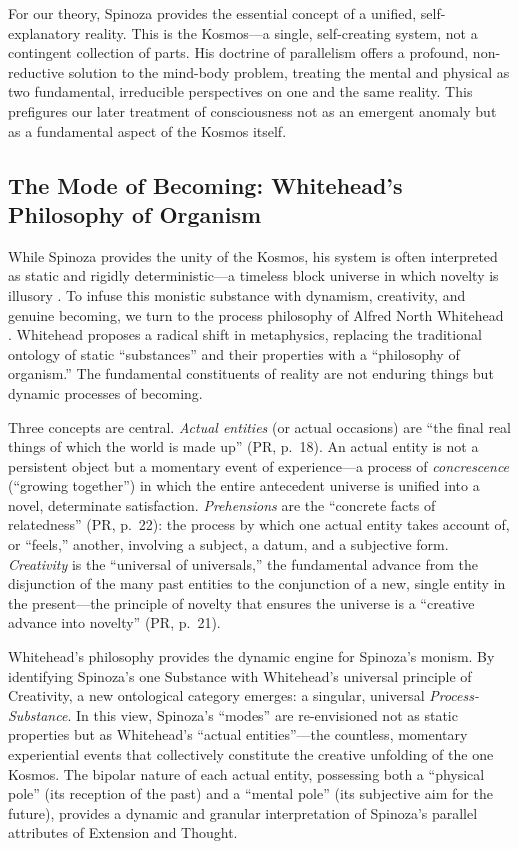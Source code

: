 \documentclass[12pt,a4paper]{article}
\begin{document}
For our theory, Spinoza provides the essential concept of a unified,
self-explanatory reality.  This is the Kosmos---a single, self-creating
system, not a contingent collection of parts.  His doctrine of parallelism
offers a profound, non-reductive solution to the mind-body problem,
treating the mental and physical as two fundamental, irreducible
perspectives on one and the same reality.  This prefigures our later
treatment of consciousness not as an emergent anomaly but as a fundamental
aspect of the Kosmos itself.

\subsection{The Mode of Becoming: Whitehead's Philosophy of Organism}
\label{sec:whitehead}

While Spinoza provides the unity of the Kosmos, his system is often
interpreted as static and rigidly deterministic---a timeless block
universe in which novelty is illusory \citep{dipoppa2010}.  To infuse this
monistic substance with dynamism, creativity, and genuine becoming, we turn
to the process philosophy of Alfred North Whitehead \citep{whitehead1929}.
Whitehead proposes a radical shift in metaphysics, replacing the
traditional ontology of static ``substances'' and their properties with a
``philosophy of organism.''  The fundamental constituents of reality are
not enduring things but dynamic processes of becoming.

Three concepts are central.  \emph{Actual entities} (or actual occasions)
are ``the final real things of which the world is made up'' (PR, p.\ 18).
An actual entity is not a persistent object but a momentary event of
experience---a process of \emph{concrescence} (``growing together'') in
which the entire antecedent universe is unified into a novel, determinate
satisfaction.  \emph{Prehensions} are the ``concrete facts of relatedness''
(PR, p.\ 22): the process by which one actual entity takes account of, or
``feels,'' another, involving a subject, a datum, and a subjective form.
\emph{Creativity} is the ``universal of universals,'' the fundamental
advance from the disjunction of the many past entities to the conjunction
of a new, single entity in the present---the principle of novelty that
ensures the universe is a ``creative advance into novelty'' (PR, p.\ 21).

Whitehead's philosophy provides the dynamic engine for Spinoza's monism.
By identifying Spinoza's one Substance with Whitehead's universal principle
of Creativity, a new ontological category emerges: a singular, universal
\emph{Process-Substance}.  In this view, Spinoza's ``modes'' are
re-envisioned not as static properties but as Whitehead's ``actual
entities''---the countless, momentary experiential events that collectively
constitute the creative unfolding of the one Kosmos.  The bipolar nature
of each actual entity, possessing both a ``physical pole'' (its reception
of the past) and a ``mental pole'' (its subjective aim for the future),
provides a dynamic and granular interpretation of Spinoza's parallel
attributes of Extension and Thought.
\end{document}
